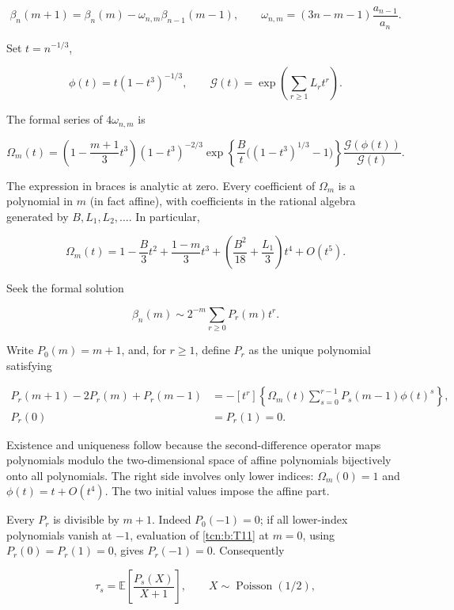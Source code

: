\documentclass[11pt,letterpaper]{article}
\theoremstyle{remark}
\begin{document}
\[
 \beta_n(m+1)=\beta_n(m)-\omega_{n,m}\beta_{n-1}(m-1),\qquad
 \omega_{n,m}=(3n-m-1)\frac{a_{n-1}}{a_n}.                         \tag{T7}\label{tcn:b:T7}
\]

Set \(t=n^{-1/3}\),

\[
 \phi(t)=t(1-t^3)^{-1/3},\qquad
 \mathcal G(t)=\exp\left(\sum_{r\ge1}L_rt^r\right).
\]

The formal series of \(4\omega_{n,m}\) is

\[
 \Omega_m(t)=\left(1-\frac{m+1}{3}t^3\right)(1-t^3)^{-2/3}
 \exp\left\{\frac B t\big((1-t^3)^{1/3}-1\big)\right\}
 \frac{\mathcal G(\phi(t))}{\mathcal G(t)}.                                    \tag{T8}\label{tcn:b:T8}
\]

The expression in braces is analytic at zero. Every coefficient of
\(\Omega_m\) is a polynomial in \(m\) (in fact affine), with coefficients in
the rational algebra generated by \(B,L_1,L_2,\ldots\). In particular,

\[
 \Omega_m(t)=1-\frac B3t^2+\frac{1-m}{3}t^3
       +\left(\frac{B^2}{18}+\frac{L_1}3\right)t^4+O(t^5).
                                                               \tag{T9}\label{tcn:b:T9}
\]

Seek the formal solution

\[
 \beta_n(m)\sim 2^{-m}\sum_{r\ge0}P_r(m)t^r.                     \tag{T10}\label{tcn:b:T10}
\]

Write \(P_0(m)=m+1\), and, for \(r\ge1\), define \(P_r\) as the unique
polynomial satisfying

\[
 \begin{aligned}
 P_r(m+1)-2P_r(m)+P_r(m-1)
  &=-[t^r]\left\{\Omega_m(t)
           \sum_{s=0}^{r-1}P_s(m-1)\phi(t)^s\right\},\\
 P_r(0)&=P_r(1)=0.
 \end{aligned}                                               \tag{T11}\label{tcn:b:T11}
\]

Existence and uniqueness follow because the second-difference operator
maps polynomials modulo the two-dimensional space of affine polynomials
bijectively onto all polynomials. The right side involves only lower
indices: \(\Omega_m(0)=1\) and \(\phi(t)=t+O(t^4)\). The two initial values
impose the affine part.

Every \(P_r\) is divisible by \(m+1\). Indeed \(P_0(-1)=0\); if all
lower-index polynomials vanish at \(-1\), evaluation of \eqref{tcn:b:T11} at \(m=0\),
using \(P_r(0)=P_r(1)=0\), gives \(P_r(-1)=0\). Consequently

\[
 \tau_s=\mathbb E\left[\frac{P_s(X)}{X+1}\right],\qquad
                 X\sim\operatorname{Poisson}(1/2),            \tag{T12}\label{tcn:b:T12}
\]
\end{document}
